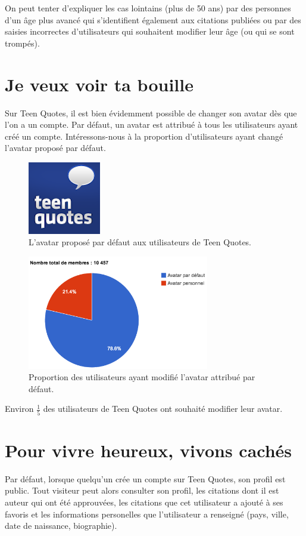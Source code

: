 \documentclass{report}
\begin{document}
	On peut tenter d'expliquer les cas lointains (plus de 50 ans) par des personnes d'un âge plus avancé qui s'identifient également aux citations publiées ou par des saisies incorrectes d'utilisateurs qui souhaitent modifier leur âge (ou qui se sont trompés).

	\section{Je veux voir ta bouille}
	Sur Teen Quotes, il est bien évidemment possible de changer son avatar dès que l'on a un compte. Par défaut, un avatar est attribué à tous les utilisateurs ayant créé un compte. Intéressons-nous à la proportion d'utilisateurs ayant changé l'avatar proposé par défaut.
	\begin{figure}[H]
		\center
		\includegraphics{images/avatarDefaut.png}
		\caption{L'avatar proposé par défaut aux utilisateurs de Teen Quotes.}
	\end{figure}

	\begin{figure}[H]
		\center
		\includegraphics[width=300px]{images/partAvatar.png}
		\caption{Proportion des utilisateurs ayant modifié l'avatar attribué par défaut.}
	\end{figure}
	Environ $\frac{1}{5}$ des utilisateurs de Teen Quotes ont souhaité modifier leur avatar.

	\section{Pour vivre heureux, vivons cachés}
	Par défaut, lorsque quelqu'un crée un compte sur Teen Quotes, son profil est public. Tout visiteur peut alors consulter son profil, les citations dont il est auteur qui ont été approuvées, les citations que cet utilisateur a ajouté à ses favoris et les informations personelles que l'utilisateur a renseigné (pays, ville, date de naissance, biographie).\\
\end{document}
